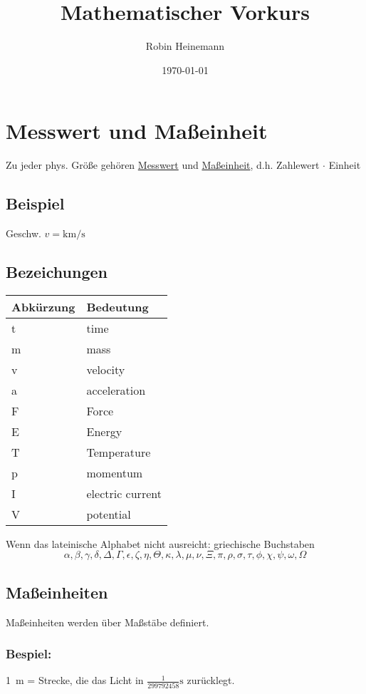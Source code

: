 \documentclass[11pt]{article}
\author{Robin Heinemann}
\date{\today}
\title{Mathematischer Vorkurs}
\begin{document}
\maketitle
\tableofcontents


\section{Messwert und Maßeinheit}
\label{sec-1}
Zu jeder phys. Größe gehören \uline{Messwert} und \uline{Maßeinheit}, d.h. Zahlewert $\cdot$ Einheit

\subsection{Beispiel}
\label{sec-1-1}
Geschw. $v = \si{\kilo\meter\per\second}$

\subsection{Bezeichungen}
\label{sec-1-2}
\begin{center}
\begin{tabular}{ll}
Abkürzung & Bedeutung\\
\hline
t & time\\
m & mass\\
v & velocity\\
a & acceleration\\
F & Force\\
E & Energy\\
T & Temperature\\
p & momentum\\
I & electric current\\
V & potential\\
\end{tabular}
\end{center}

Wenn das lateinische  Alphabet nicht ausreicht: griechische Buchstaben
\[\alpha, \beta, \gamma, \delta, \Delta, \Gamma, \epsilon, \zeta, \eta, \Theta, \kappa, \lambda, \mu, \nu, \Xi, \pi, \rho, \sigma, \tau, \phi, \chi, \psi, \omega, \Omega\]

\subsection{Maßeinheiten}
\label{sec-1-3}
Maßeinheiten werden über Maßstäbe definiert.

\subsubsection{Bespiel:}
\label{sec-1-3-1}
\SI{1}{\meter} = Strecke, die das Licht in $\frac{1}{299792458}\si{\second}$ zurücklegt.
\end{document}
